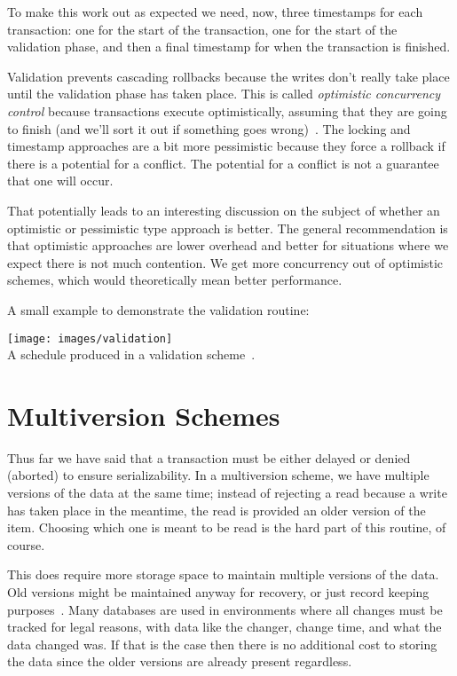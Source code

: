 To make this work out as expected we need, now, three timestamps for each transaction: one for the start of the transaction, one for the start of the validation phase, and then a final timestamp for when the transaction is finished.

Validation prevents cascading rollbacks because the writes don't really take place until the validation phase has taken place. This is called \textit{optimistic concurrency control} because transactions execute optimistically, assuming that they are going to finish (and we'll sort it out if something goes wrong)~\cite{dsc}. The locking and timestamp approaches are a bit more pessimistic because they force a rollback if there is a potential for a conflict. The potential for a conflict is not a guarantee that one will occur.

That potentially leads to an interesting discussion on the subject of whether an optimistic or pessimistic type approach is better. The general recommendation is that optimistic approaches are lower overhead and better for situations where we expect there is not much contention. We get more concurrency out of optimistic schemes, which would theoretically mean better performance.

A small example to demonstrate the validation routine:

\begin{center}
	\texttt{[image: images/validation]}\\
	A schedule produced in a validation scheme~\cite{dsc}.
\end{center}

\section*{Multiversion Schemes}

Thus far we have said that a transaction must be either delayed or denied (aborted) to ensure serializability. In a multiversion scheme, we have multiple versions of the data at the same time; instead of rejecting a read because a write has taken place in the meantime, the read is provided an older version of the item. Choosing which one is meant to be read is the hard part of this routine, of course.

This does require more storage space to maintain multiple versions of the data. Old versions might be maintained anyway for recovery, or just record keeping purposes~\cite{fds}. Many databases are used in environments where all changes must be tracked for legal reasons, with data like the changer, change time, and what the data changed was. If that is the case then there is no additional cost to storing the data since the older versions are already present regardless. 


